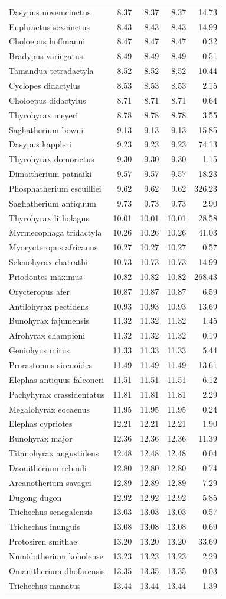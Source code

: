 \documentclass[10pt,letterpaper]{article}
\begin{document}
\begin{longtable}[]{@{}lrrrr@{}}
Dasypus novemcinctus & 8.37 & 8.37 & 8.37 & 14.73\tabularnewline
Euphractus sexcinctus & 8.43 & 8.43 & 8.43 & 14.99\tabularnewline
Choloepus hoffmanni & 8.47 & 8.47 & 8.47 & 0.32\tabularnewline
Bradypus variegatus & 8.49 & 8.49 & 8.49 & 0.51\tabularnewline
Tamandua tetradactyla & 8.52 & 8.52 & 8.52 & 10.44\tabularnewline
Cyclopes didactylus & 8.53 & 8.53 & 8.53 & 2.15\tabularnewline
Choloepus didactylus & 8.71 & 8.71 & 8.71 & 0.64\tabularnewline
Thyrohyrax meyeri & 8.78 & 8.78 & 8.78 & 3.55\tabularnewline
Saghatherium bowni & 9.13 & 9.13 & 9.13 & 15.85\tabularnewline
Dasypus kappleri & 9.23 & 9.23 & 9.23 & 74.13\tabularnewline
Thyrohyrax domorictus & 9.30 & 9.30 & 9.30 & 1.15\tabularnewline
Dimaitherium patnaiki & 9.57 & 9.57 & 9.57 & 18.23\tabularnewline
Phosphatherium escuilliei & 9.62 & 9.62 & 9.62 & 326.23\tabularnewline
Saghatherium antiquum & 9.73 & 9.73 & 9.73 & 2.90\tabularnewline
Thyrohyrax litholagus & 10.01 & 10.01 & 10.01 & 28.58\tabularnewline
Myrmecophaga tridactyla & 10.26 & 10.26 & 10.26 & 41.03\tabularnewline
Myorycteropus africanus & 10.27 & 10.27 & 10.27 & 0.57\tabularnewline
Selenohyrax chatrathi & 10.73 & 10.73 & 10.73 & 14.99\tabularnewline
Priodontes maximus & 10.82 & 10.82 & 10.82 & 268.43\tabularnewline
Orycteropus afer & 10.87 & 10.87 & 10.87 & 6.59\tabularnewline
Antilohyrax pectidens & 10.93 & 10.93 & 10.93 & 13.69\tabularnewline
Bunohyrax fajumensis & 11.32 & 11.32 & 11.32 & 1.45\tabularnewline
Afrohyrax championi & 11.32 & 11.32 & 11.32 & 0.19\tabularnewline
Geniohyus mirus & 11.33 & 11.33 & 11.33 & 5.44\tabularnewline
Prorastomus sirenoides & 11.49 & 11.49 & 11.49 & 13.61\tabularnewline
Elephas antiquus falconeri & 11.51 & 11.51 & 11.51 & 6.12\tabularnewline
Pachyhyrax crassidentatus & 11.81 & 11.81 & 11.81 & 2.29\tabularnewline
Megalohyrax eocaenus & 11.95 & 11.95 & 11.95 & 0.24\tabularnewline
Elephas cypriotes & 12.21 & 12.21 & 12.21 & 1.90\tabularnewline
Bunohyrax major & 12.36 & 12.36 & 12.36 & 11.39\tabularnewline
Titanohyrax angustidens & 12.48 & 12.48 & 12.48 & 0.04\tabularnewline
Daouitherium rebouli & 12.80 & 12.80 & 12.80 & 0.74\tabularnewline
Arcanotherium savagei & 12.89 & 12.89 & 12.89 & 7.29\tabularnewline
Dugong dugon & 12.92 & 12.92 & 12.92 & 5.85\tabularnewline
Trichechus senegalensis & 13.03 & 13.03 & 13.03 & 0.57\tabularnewline
Trichechus inunguis & 13.08 & 13.08 & 13.08 & 0.69\tabularnewline
Protosiren smithae & 13.20 & 13.20 & 13.20 & 33.69\tabularnewline
Numidotherium koholense & 13.23 & 13.23 & 13.23 & 2.29\tabularnewline
Omanitherium dhofarensis & 13.35 & 13.35 & 13.35 & 0.03\tabularnewline
Trichechus manatus & 13.44 & 13.44 & 13.44 & 1.39\tabularnewline

\end{longtable}
\end{document}
